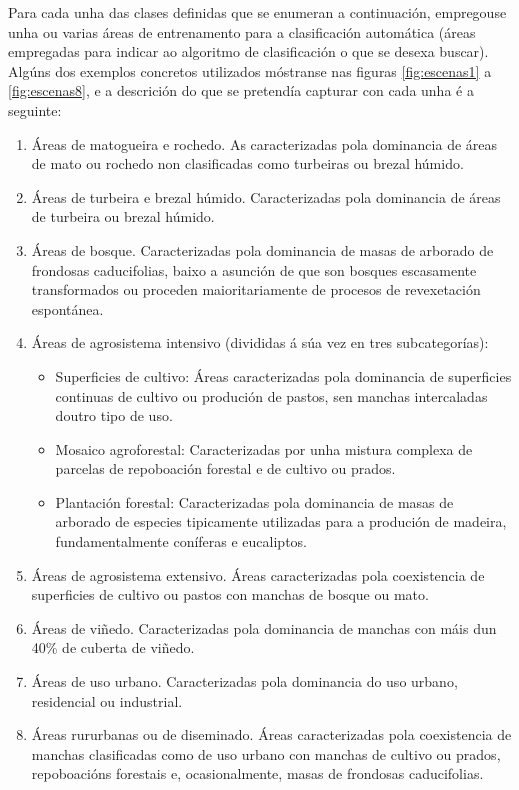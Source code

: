 \documentclass[11pt,a4paper]{article}
\begin{document}
Para cada unha das clases definidas que se enumeran a continuación, empregouse unha ou varias áreas de entrenamento para a clasificación automática (áreas empregadas para indicar ao algoritmo de clasificación o que se desexa buscar). Algúns dos exemplos concretos utilizados móstranse nas figuras \ref{fig:escenas1} a \ref{fig:escenas8}, e a descrición do que se pretendía capturar con cada unha é a seguinte:

\begin{enumerate}
 \item Áreas de matogueira e rochedo. As caracterizadas pola dominancia de áreas de mato ou rochedo non clasificadas como turbeiras ou brezal húmido.
 \item Áreas de turbeira e brezal húmido. Caracterizadas pola dominancia de áreas de turbeira ou brezal húmido.
 \item Áreas de bosque. Caracterizadas pola dominancia de masas de arborado de frondosas caducifolias, baixo a asunción de que son bosques escasamente transformados ou proceden maioritariamente de procesos de revexetación espontánea.
 \item Áreas de agrosistema intensivo (divididas á súa vez en tres subcategorías):
 \begin{itemize}
  \item Superficies de cultivo: Áreas caracterizadas pola dominancia de superficies continuas de cultivo ou produción de pastos, sen manchas intercaladas doutro tipo de uso.
  \item Mosaico agroforestal: Caracterizadas por unha mistura complexa de parcelas de repoboación forestal e de cultivo ou prados.
  \item Plantación forestal: Caracterizadas pola dominancia de masas de arborado de especies tipicamente utilizadas para a produción de madeira, fundamentalmente coníferas e eucaliptos.
 \end{itemize}
 \item Áreas de agrosistema extensivo. Áreas caracterizadas pola coexistencia de superficies de cultivo ou pastos con manchas de bosque ou mato.
 \item Áreas de viñedo. Caracterizadas pola dominancia de manchas con máis dun 40\% de cuberta de viñedo.
 \item Áreas de uso urbano. Caracterizadas pola dominancia do uso urbano, residencial ou industrial.
 \item Áreas rururbanas ou de diseminado. Áreas caracterizadas pola coexistencia de manchas clasificadas como de uso urbano con manchas de cultivo ou prados, repoboacións forestais e, ocasionalmente, masas de frondosas caducifolias.

\end{enumerate}
\end{document}
